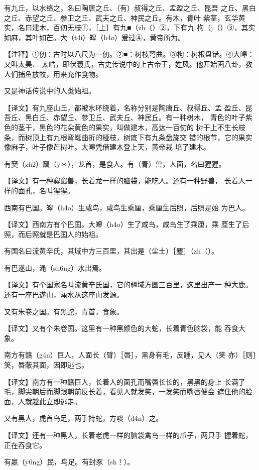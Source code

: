 \documentclass[a4paper,12pt,UTF8,twoside]{ctexbook}
\begin{document}
有九丘，以水络之，名曰陶唐之丘、（有）叔得之丘、孟盈之丘、昆吾 之丘、黑白之丘、赤望之丘、参卫之丘、武夫之丘、神民之丘。有木，青叶 紫茎，玄华黄实，名曰建木，百仞无枝①，［上］有九■（zh（）②，下有九 枸（j（）③，其实如麻，其叶如芒。大（t4i）皞（h4o）爰过④，黄帝所为。

【注释】①仞：古时以八尺为一仞。②■：树枝弯曲。③枸：树根盘错。④大皞：又叫太昊、 太皓，即伏羲氏，古史传说中的上古帝王，姓风。他开始画八卦，教人们捕鱼放牧，用来充作食物。

又是神话传说中的人类始祖。

【译文】有九座山丘，都被水环绕着，名称分别是陶唐丘、叔得丘、孟 盈丘、昆吾丘、黑白丘、赤望丘、参卫丘、武夫丘、神民丘。有一种树木， 青色的叶子紫色的茎干，黑色的花朵黄色的果实，叫做建木，高达一百仞的 树干上不生长枝条，而树顶上有九根弯蜒曲折的桠枝，树底下有九条盘旋交 错的根节，它的果实像麻子，叶子像芒树叶。大皞凭借建木登上天，黄帝栽 培了建木。

有窫（zh2）窳（y＊），龙首，是食人。有（青）兽，人面，名曰猩猩。

【译文】有一种窫窳兽，长着龙一样的脑袋，能吃人。还有一种野兽， 长着人一样的面孔，名叫猩猩。

西南有巴国。皞（h4o）生咸鸟，咸鸟生乘厘，乘厘生后照，后照是始 为巴人。

【译文】西南方有个巴国。大皞（h4o）生了咸鸟，咸鸟生了乘厘，乘 厘生了后照，而后照就是巴国人的始祖。

有国名曰流黄辛氏，其域中方三百里，其出是（尘土）［麈］（zh（）。

有巴遂山，渑（sh6ng）水出焉。

【译文】有个国家名叫流黄辛氏国，它的疆域方圆三百里，这里出产一 种大鹿。还有一座巴遂山，渑水从这座山发源。

又有朱卷之国。有黑蛇，青首，食象。

【译文】又有个朱卷国。这里有一种黑颜色的大蛇，长着青色脑袋，能 吞食大象。

南方有赣（g4n）巨人，人面长（臂）［唇］，黑身有毛，反踵，见人（笑 亦）［则］笑，唇蔽其面，因即逃也。

【译文】南方有一种赣巨人，长着人的面孔而嘴唇长长的，黑黑的身上 长满了毛，脚尖朝后而脚跟朝前反长着，看见人就发笑，一发笑而嘴唇便会 遮住他的脸面，人就趁此立即逃走。

又有黑人，虎首鸟足，两手持蛇，方啖（d4n）之。

【译文】还有一种黑人，长着老虎一样的脑袋禽鸟一样的爪子，两只手 握着蛇，正在吞食它。

有嬴（y0ng）民，鸟足。有封豕（sh！）。
\end{document}
